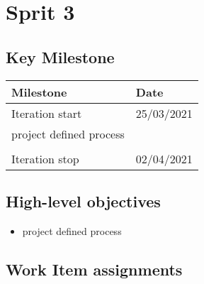 \clearpage
\section{Sprit 3}

\subsection*{Key Milestone}


\noindent\begin{tabular}{|l|l|}
\hline
Milestone       & Date \\ \hline
Iteration start & 25/03/2021 \\ \hline
project defined process &      \\ \hline
                &      \\ \hline
Iteration stop  & 02/04/2021 \\ \hline
\end{tabular}

\subsection*{High-level objectives}

\begin{itemize}
	\item project defined process
\end{itemize}

\subsection*{Work Item assignments}


